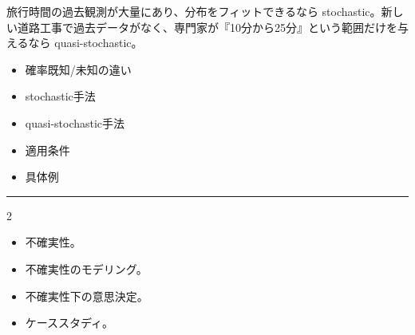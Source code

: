 旅行時間の過去観測が大量にあり、分布をフィットできるなら stochastic。新しい道路工事で過去データがなく、専門家が『10分から25分』という範囲だけを与えるなら quasi-stochastic。\par
{}
\begin{itemize}
\item 確率既知/未知の違い
\item stochastic手法
\item quasi-stochastic手法
\item 適用条件
\item 具体例
\end{itemize}
\vspace{2mm}\hrule\vspace{2mm}

\clearpage
{}
\begin{multicols}{2}\scriptsize\raggedcolumns
{}
\begin{itemize}
\item 不確実性。
\item 不確実性のモデリング。
\item 不確実性下の意思決定。
\item ケーススタディ。
\end{itemize}
\end{multicols}

